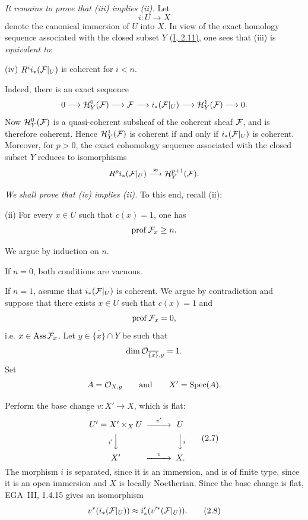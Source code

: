 \medskip
\noindent\textit{It remains to prove that \textup{(iii)} implies
\textup{(ii)}.} Let
\[
  i\colon U\longrightarrow X
\]
denote the canonical immersion of $U$ into $X$. In view of the exact homology
sequence associated with the closed subset $Y$ (\hyperref[I.2.11]{I, 2.11)}, one sees that
\textup{(iii)} is \textit{equivalent to}:

\medskip
\noindent\textup{(iv)} $R^i i_*(\cF|_U)$ is coherent for $i<n$.
\label{condition}

\medskip
{}\quad Indeed, there is
an exact sequence
\[
  0\longrightarrow \sH_Y^0(\cF)\longrightarrow \cF
  \longrightarrow i_*(\cF|_U)\longrightarrow \sH_Y^1(\cF)
  \longrightarrow 0.
\]
Now $\sH_Y^0(\cF)$ is a quasi-coherent subsheaf of the coherent sheaf $\cF$,
and is therefore coherent. Hence $\sH_Y^1(\cF)$ is coherent if and only if
$i_*(\cF|_U)$ is coherent. Moreover, for $p>0$, the exact cohomology sequence
associated with the closed subset $Y$ reduces to isomorphisms
\[
  R^p i_*(\cF|_U)\overset{\approx}{\longrightarrow}\sH_Y^{p+1}(\cF).
\]

\medskip
\noindent\textit{We shall prove that \textup{(iv)} implies
\textup{(ii)}.} To this end, recall \textup{(ii)}:

\medskip
\noindent\textup{(ii)} For every $x\in U$ such that $c(x)=1$, one has
\[
  \operatorname{prof}\cF_x\geq n.
\]

\noindent We argue by induction on $n$.

\medskip
\noindent If $n=0$, both conditions are vacuous.


\medskip
\noindent If $n=1$, assume that $i_*(\cF|_U)$ is coherent. We argue by
contradiction and suppose that there exists $x\in U$ such that $c(x)=1$ and
\[
  \prof\cF_x=0,
\]
i.e. $x\in\Ass\cF_x$. Let $y\in\overline{\{x\}}\cap Y$ be such that
\[
  \dim\mathcal O_{\overline{\{x\}},y}=1.
\]
Set
\[
  A=\mathcal O_{X,y}\qquad\text{and}\qquad X'=\operatorname{Spec}(A).
\]

\setcounter{equation}{6}
\noindent Perform the base change $v\colon X'\longrightarrow X$, which is
flat:
\begin{equation}
\begin{CD}
U'=X'\times_X U @>{v'}>> U\\
@V{i'}VV @VV{i}V\\
X' @>{v}>> X .
\end{CD}
\tag{2.7}\label{eq:VIII.2.7}
\end{equation}
The morphism $i$ is separated, since it is an immersion, and is of finite
type, since it is an open immersion and $X$ is locally Noetherian. Since the
base change is flat, EGA~III, 1.4.15 gives an isomorphism
\begin{equation}
  v^*(i_*(\cF|_U))
  \approx
  i'_*(v'^*(\cF|_U)).
\tag{2.8}\label{eq:VIII.2.8}
\end{equation}

